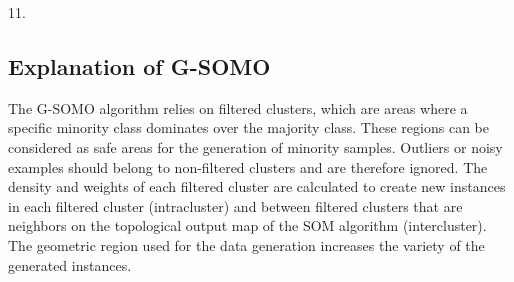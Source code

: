 \documentclass[parskip=full]{scrartcl}
\begin{document}
\begin{algorithm}[H]
	11. 	
\vspace{\baselineskip}
\end{algorithm}

\subsection{Explanation of G-SOMO}

The G-SOMO algorithm relies on filtered clusters, which are areas where a specific minority class 
dominates over the majority class. These regions can be considered as safe areas for the generation 
of minority samples. Outliers or noisy examples should belong to non-filtered clusters and are therefore 
ignored. The density and weights of each filtered cluster are calculated to create new instances in 
each filtered cluster (intracluster) and between filtered clusters that are neighbors on the topological 
output map of the SOM algorithm (intercluster). The geometric region used for the data generation increases
 the variety of the generated instances. 
\end{document}
